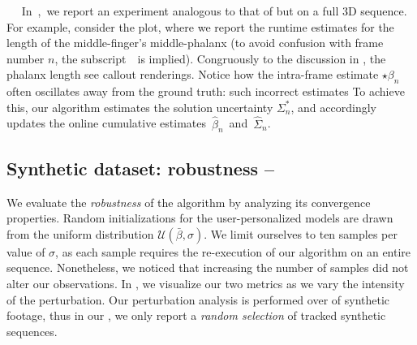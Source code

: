 %
$\quad$
% 
In~,~we report an experiment analogous to that of  but on a full 3D sequence. For example, consider the {\small \TODO{$\beta_{[?]}$}} plot, where we report the runtime estimates for the length of the middle-finger's middle-phalanx (to avoid confusion with frame number $n$, the subscript~\TODO{{\small$[?]$}}~is implied). Congruously to the discussion in , the phalanx length 
see callout renderings.
Notice how the intra-frame estimate {\small $\star\beta_n$} often oscillates away from the ground truth: 
such incorrect estimates 
 To achieve this, our algorithm estimates the solution uncertainty {\small $\Sigma^*_n$}, and accordingly updates the online cumulative estimates~{\small $\hat\beta_n$}~and~{\small $\hat\Sigma_n$}.

\subsection{Synthetic dataset: robustness -- }
\label{sec:evalsynth}
We evaluate the \emph{robustness} of the algorithm by analyzing its convergence properties. Random initializations for the user-personalized models are drawn from the uniform distribution {\small $\mathcal{U}(\bar\beta, \sigma)$}.
We limit ourselves to ten samples per value of $\sigma$, as each sample requires the re-execution of our algorithm on an entire sequence. Nonetheless, we noticed that increasing the number of samples did not alter our observations.
In , we visualize our two metrics as we vary the intensity of the perturbation.
 Our perturbation analysis is performed over  of synthetic footage, thus in our \VideoSynth{}, we only report a \emph{random selection} of tracked synthetic sequences.


